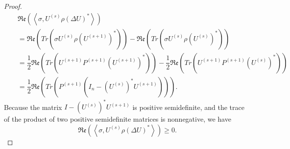 \documentclass[sn-mathphys-num]{sn-jnl}%
\newcommand{\rinner}[1]{\mathfrak{Re}\left(\left<#1\right>\right)}
\theoremstyle{thmstyleone}%
\theoremstyle{thmstyletwo}%
\theoremstyle{thmstylethree}%
\begin{document}
\begin{proof}
    \begin{eqnarray*}
        &&\rinner{\sigma, U^{(s)}\rho \left(\Delta U\right)^*} \\&&= \mathfrak{Re}\left(Tr\left(\sigma U^{(s)}\rho \left(U^{(s+1)}\right)^*\right)\right) - \mathfrak{Re}\left(Tr\left(\sigma U^{(s)}\rho \left(U^{(s)}\right)^*\right)\right)\\
        &&=  \dfrac{1}{2}        \mathfrak{Re}\left(Tr\left(U^{(s+1)}P^{(s+1)} \left(U^{(s+1)}\right)^*\right)\right) -\dfrac{1}{2}
    \mathfrak{Re}\left(Tr\left(U^{(s+1)}P^{(s+1)} \left(U^{(s)}\right)^*\right)\right)\\
        &&=\dfrac{1}{2}
     \mathfrak{Re}\left(Tr\left(P^{(s+1)}\left(I_n-\left(U^{(s)}\right)^*
       U^{(s+1)}
       \right)  \right)\right)
       .
    \end{eqnarray*}
    Because the matrix $I-\left(U^{(s)}\right)^*U^{(s+1)}$ is positive semidefinite, and the trace of the product of two positive semidefinite matrices is nonnegative, we have
    \begin{equation*}
        \rinner{\sigma, U^{(s)}\rho \left(\Delta U\right)^*} \geq 0.
         \end{equation*}


\end{proof}
\end{document}
